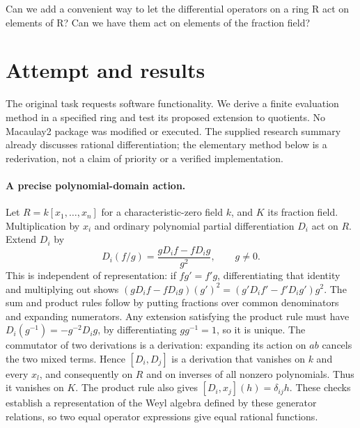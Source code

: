 \documentclass[11pt]{article}
\begin{document}
Can we add a convenient way to let the differential operators on a ring R act on elements of R? Can we have them act on elements of the fraction field?

\section{Attempt and results}
The original task requests software functionality. We derive a finite evaluation
method in a specified ring and test its proposed extension to quotients. No
Macaulay2 package was modified or executed. The supplied research summary
already discusses rational differentiation; the elementary method below is a
rederivation, not a claim of priority or a verified implementation.

\paragraph{A precise polynomial-domain action.}
Let $R=k[x_1,\ldots,x_n]$ for a characteristic-zero field $k$, and $K$ its
fraction field. Multiplication by $x_i$ and ordinary polynomial partial
 differentiation $D_i$ act on $R$. Extend $D_i$ by
\[
D_i(f/g)=\frac{gD_if-fD_ig}{g^2},\qquad g\ne0.
\]
This is independent of representation: if $fg'=f'g$, differentiating that
identity and multiplying out shows
$(gD_if-fD_ig)(g')^2=(g'D_if'-f'D_ig')g^2$.
The sum and product rules follow by putting fractions over common denominators
and expanding numerators. Any extension satisfying the product rule must have
$D_i(g^{-1})=-g^{-2}D_ig$, by differentiating $gg^{-1}=1$, so it is unique.
The commutator of two derivations is a derivation: expanding its action on $ab$
cancels the two mixed terms. Hence $[D_i,D_j]$ is a derivation that vanishes on
$k$ and every $x_l$, and consequently on $R$ and on inverses of all nonzero
polynomials. Thus it vanishes on $K$. The product rule also gives
$[D_i,x_j](h)=\delta_{ij}h$. These checks establish a representation of the
Weyl algebra defined by these generator relations, so two equal operator
expressions give equal rational functions.
\end{document}
